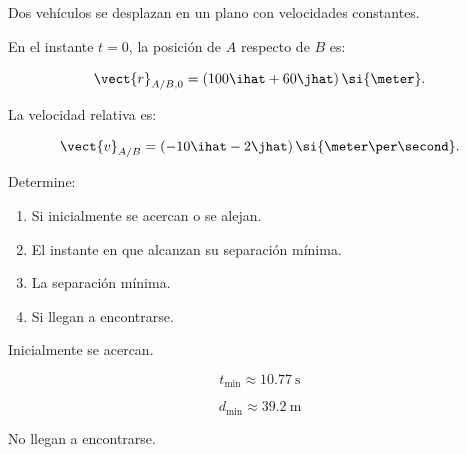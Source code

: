 \begin{ejercicio}
Dos vehículos se desplazan en un plano
con velocidades constantes.

En el instante \(t=0\), la posición
de \(A\) respecto de \(B\) es:

\[
\vect{r}_{A/B,0}
=
(100\ihat+60\jhat)\,\si{\meter}.
\]

La velocidad relativa es:

\[
\vect{v}_{A/B}
=
(-10\ihat-2\jhat)\,
\si{\meter\per\second}.
\]

Determine:

\begin{enumerate}[label=\alph*)]
    \item Si inicialmente se acercan o se alejan.
    \item El instante en que alcanzan
    su separación mínima.
    \item La separación mínima.
    \item Si llegan a encontrarse.
\end{enumerate}
\end{ejercicio}

\begin{respuesta}
Inicialmente se acercan.

\[
\boxed{
t_{\min}\approx
\SI{10.77}{\second}
}
\]

\[
\boxed{
d_{\min}\approx
\SI{39.2}{\meter}
}
\]

No llegan a encontrarse.
\end{respuesta}

